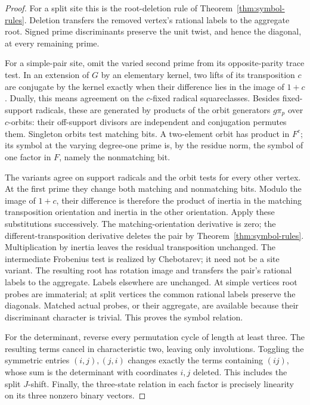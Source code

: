 \begin{proof}
For a split site this is the root-deletion rule of
Theorem~\ref{thm:symbol-rules}. Deletion transfers the removed
vertex's rational labels to the aggregate root. Signed prime
discriminants preserve the unit twist, and hence the diagonal,
at every remaining prime.

For a simple-pair site, omit the varied second prime from its
opposite-parity trace test. In an extension of $G$ by an elementary
kernel, two lifts of its transposition $c$ are conjugate by the kernel
exactly when their difference lies in the image of $1+c$. Dually,
this means agreement on the $c$-fixed radical squareclasses.
Besides fixed-support radicals, these are generated by products of
the orbit generators $g\pi_p$ over $c$-orbits: their off-support
divisors are independent and conjugation permutes them. Singleton
orbits test matching bits. A two-element orbit has product in $F^c$;
its symbol at the varying degree-one prime is, by the residue norm,
the symbol of one factor in $F$, namely the nonmatching bit.

The variants agree on support radicals and the orbit tests for every
other vertex. At the first prime they change both matching and
nonmatching bits. Modulo the image of $1+c$, their difference is
therefore the product of inertia in the matching transposition
orientation and inertia in the other orientation. Apply these
substitutions successively. The matching-orientation derivative is zero;
the different-transposition derivative deletes the pair by
Theorem~\ref{thm:symbol-rules}. Multiplication
by inertia leaves the residual transposition unchanged. The intermediate
Frobenius test is realized by Chebotarev; it need not be a site variant.
The resulting root has rotation image and transfers the pair's rational
labels to the aggregate. Labels elsewhere are unchanged. At simple
vertices root probes are immaterial; at split vertices the common
rational labels preserve the diagonals. Matched actual probes, or their
aggregate, are available because their discriminant character is trivial.
This proves the symbol relation.

For the determinant, reverse every permutation cycle of length at
least three. The resulting terms cancel in characteristic two, leaving
only involutions. Toggling the symmetric entries $(i,j),(j,i)$ changes
exactly the terms containing $(ij)$, whose sum is the determinant with
coordinates $i,j$ deleted. This includes the split $J$-shift. Finally,
the three-state relation in each factor is precisely linearity on its
three nonzero binary vectors.
\end{proof}

